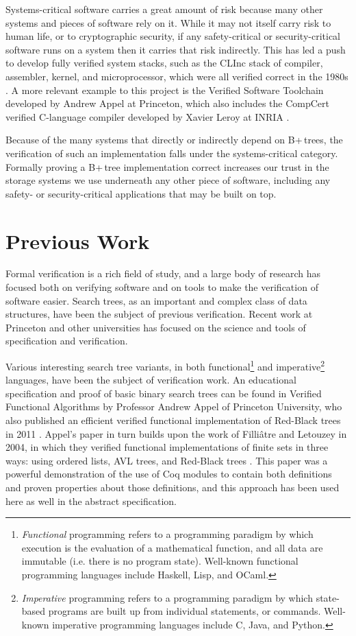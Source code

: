 \documentclass[a4paper,12pt]{article}
\begin{document}
Systems-critical software carries a great amount of risk because many other systems and pieces of software rely on it. While it may not itself carry risk to human life, or to cryptographic security, if any safety-critical or security-critical software runs on a system then it carries that risk indirectly. This has led a push to develop fully verified system stacks, such as the CLInc stack of compiler, assembler, kernel, and microprocessor, which were all verified correct in the 1980s \cite{225554}. A more relevant example to this project is the Verified Software Toolchain developed by Andrew Appel at Princeton, which also includes the CompCert verified C-language compiler developed by Xavier Leroy at INRIA \cite{Leroy:2009:FVR:1538788.1538814}.

Because of the many systems that directly or indirectly depend on B+\,trees, the verification of such an implementation falls under the systems-critical category. Formally proving a B+\,tree implementation correct increases our trust in the storage systems we use underneath any other piece of software, including any safety- or security-critical applications that may be built on top.

\clearpage

\section{Previous Work}

Formal verification is a rich field of study, and a large body of research has focused both on verifying software and on tools to make the verification of software easier. Search trees, as an important and complex class of data structures, have been the subject of previous verification. Recent work at Princeton and other universities has focused on the science and tools of specification and verification.

Various interesting search tree variants, in both functional\footnote{\textit{Functional} programming refers to a programming paradigm by which execution is the evaluation of a mathematical function, and all data are immutable (i.e. there is no program state). Well-known functional programming languages include Haskell, Lisp, and OCaml.} and imperative\footnote{\textit{Imperative} programming refers to a programming paradigm by which state-based programs are built up from individual statements, or commands. Well-known imperative programming languages include C, Java, and Python.} languages, have been the subject of verification work. An educational specification and proof of basic binary search trees can be found in Verified Functional Algorithms \cite{appel} by Professor Andrew Appel of Princeton University, who also published an efficient verified functional implementation of Red-Black trees in 2011 \cite{appel_2011}. Appel’s paper in turn builds upon the work of Filliâtre and Letouzey in 2004, in which they verified functional implementations of finite sets in three ways: using ordered lists, AVL trees, and Red-Black trees \cite{filliatre:hal-00150913}. This paper was a powerful demonstration of the use of Coq modules to contain both definitions and proven properties about those definitions, and this approach has been used here as well in the abstract specification.
\end{document}
